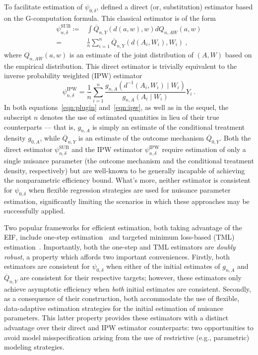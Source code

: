 To facilitate estimation of $\psi_{0,\delta}$, \citet{diaz2012population,
diaz2018stochastic} defined a direct (or, substitution) estimator based on the
G-computation formula. This classical estimator is of the form
\begin{align}\label{eqn:plugin}
  \psi_{n,\delta}^{\text{SUB}} \coloneqq&
      \int \overline{Q}_{n,Y}(d(a, w), w) dQ_{n,AW}(a,w) \nonumber \\
      =& \frac{1}{n} \sum_{i=1}^n \overline{Q}_{n,Y}(d(A_i, W_i), W_i)\ ,
\end{align}
where $Q_{n,AW}(a,w)$ is an estimate of the joint distribution of $(A,W)$ based
on the empirical distribution. This direct estimator is trivially equivalent to
the inverse probability weighted (IPW) estimator
\begin{equation}\label{eqn:ipw}
  \psi_{n,\delta}^{\text{IPW}} = \frac{1}{n} \sum_{i=1}^n \frac{g_{n, A}
    (d^{-1}(A_i, W_i) \mid W_i)}{g_{n, A}(A_i \mid W_i)} Y_i \ .
\end{equation}
In both equations~\ref{eqn:plugin} and~\ref{eqn:ipw}, as well as in the sequel,
the subscript $n$ denotes the use of estimated quantities in lieu of their true
counterparts --- that is, $g_{n,A}$ is simply an estimate of the conditional
treatment density $g_{0,A}$, while $\overline{Q}_{n,Y}$ is an estimate of the
outcome mechanism $\overline{Q}_{0,Y}$. Both the direct estimator
$\psi_{n,\delta}^{\text{SUB}}$ and the IPW estimator
$\psi_{n,\delta}^{\text{IPW}}$ require estimation of only a single nuisance
parameter (the outcome mechanism and the conditional treatment density,
respectively) but are well-known to be generally incapable of achieving the
nonparametric efficiency bound. What's more, neither estimator is consistent for
$\psi_{0,\delta}$ when flexible regression strategies are used for nuisance
parameter estimation, significantly limiting the scenarios in which these
approaches may be successfully applied.

Two popular frameworks for efficient estimation, both taking advantage of the
EIF, include one-step
estimation~\citep{pfanzagl1985contributions,bickel1993efficient} and targeted
minimum loss-based (TML) estimation~\citep{vdl2006targeted, vdl2011targeted,
vdl2018targeted}. Importantly, both the one-step and TML estimators are
\textit{doubly robust}, a property which affords two important conveniences.
Firstly, both estimators are consistent for $\psi_{0,\delta}$ when either of the
initial estimates of $g_{n,A}$ and $\overline{Q}_{n,Y}$ are consistent for their
respective targets; however, these estimators only achieve asymptotic efficiency
when \textit{both} initial estimates are consistent. Secondly, as a consequence
of their construction, both accommodate the use of flexible, data-adaptive
estimation strategies for the initial estimation of nuisance parameters. This
latter property provides these estimators with a distinct advantage over their
direct and IPW estimator counterparts: two opportunities to avoid model
misspecification arising from the use of restrictive (e.g., parametric) modeling
strategies.

